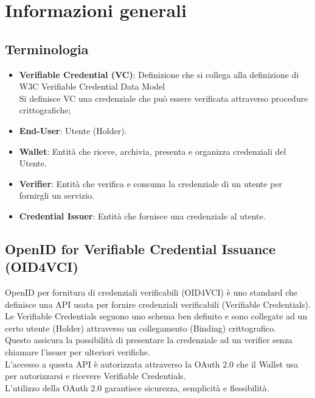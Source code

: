 \section{Informazioni generali}

\subsection{Terminologia}
\begin{itemize}
    \item \textbf{Verifiable Credential (VC)}: Definizione che si collega alla definizione di W3C Verifiable Credential Data Model\\
    Si definisce VC una credenziale che può essere verificata attraverso procedure crittografiche;
    \item \textbf{End-User}: Utente (Holder).
    \item \textbf{Wallet}: Entità che riceve, archivia, presenta e organizza credenziali del Utente.
    \item \textbf{Verifier}: Entità che verifica e consuma la credenziale di un utente per fornirgli un servizio.
    \item \textbf{Credential Issuer}: Entità che fornisce una credenziale al utente.
\end{itemize}

\subsection{OpenID for Verifiable Credential Issuance (OID4VCI)}
OpenID per fornitura di credenziali verificabili (OID4VCI) è uno standard che definisce una API usata per fornire credenziali verificabili (Verifiable Credentials).
\\Le Verifiable Credentials seguono uno schema ben definito e sono collegate ad un certo utente (Holder) attraverso un collegamento (Binding) crittografico.
\\Questo assicura la possibilità di presentare la credenziale ad un verifier senza chiamare l'issuer per ulteriori verifiche.
\\L'accesso a questa API è autorizzata attraverso la OAuth 2.0 che il Wallet usa per autorizzarsi e ricevere Verifiable Credentials.
\\L'utilizzo della OAuth 2.0 garantisce sicurezza, semplicità e flessibilità.

